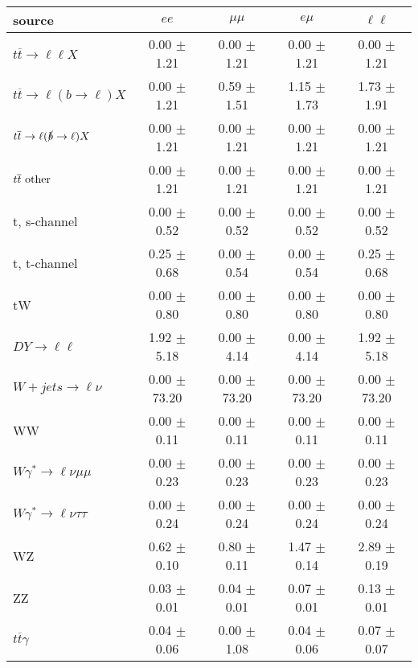 \begin{tabular}{l|cccc} \hline\hline
source & $ee$ & $\mu\mu$ & $e\mu$ & $\ell\ell $ \\
\hline
$t\overline{t} \rightarrow \ell \ell X$ &  0.00 $\pm$  1.21 &  0.00 $\pm$  1.21 &  0.00 $\pm$  1.21 &  0.00 $\pm$  1.21 \\
$t\overline{t} \rightarrow \ell (b \rightarrow \ell) X$ &  0.00 $\pm$  1.21 &  0.59 $\pm$  1.51 &  1.15 $\pm$  1.73 &  1.73 $\pm$  1.91 \\
$t\overline{t} \rightarrow \ell (\slashed b \rightarrow \ell) X$ &  0.00 $\pm$  1.21 &  0.00 $\pm$  1.21 &  0.00 $\pm$  1.21 &  0.00 $\pm$  1.21 \\
        $t\overline{t}\ \rm{other}$ &  0.00 $\pm$  1.21 &  0.00 $\pm$  1.21 &  0.00 $\pm$  1.21 &  0.00 $\pm$  1.21 \\
\hline
                       t, s-channel &  0.00 $\pm$  0.52 &  0.00 $\pm$  0.52 &  0.00 $\pm$  0.52 &  0.00 $\pm$  0.52 \\
                       t, t-channel &  0.25 $\pm$  0.68 &  0.00 $\pm$  0.54 &  0.00 $\pm$  0.54 &  0.25 $\pm$  0.68 \\
                                 tW &  0.00 $\pm$  0.80 &  0.00 $\pm$  0.80 &  0.00 $\pm$  0.80 &  0.00 $\pm$  0.80 \\
\hline
         $DY \rightarrow \ell \ell$ &  1.92 $\pm$  5.18 &  0.00 $\pm$  4.14 &  0.00 $\pm$  4.14 &  1.92 $\pm$  5.18 \\
      $W+jets \rightarrow \ell \nu$ &  0.00 $\pm$ 73.20 &  0.00 $\pm$ 73.20 &  0.00 $\pm$ 73.20 &  0.00 $\pm$ 73.20 \\
                                 WW &  0.00 $\pm$  0.11 &  0.00 $\pm$  0.11 &  0.00 $\pm$  0.11 &  0.00 $\pm$  0.11 \\
\hline
$W\gamma^{*} \rightarrow \ell \nu \mu\mu$ &  0.00 $\pm$  0.23 &  0.00 $\pm$  0.23 &  0.00 $\pm$  0.23 &  0.00 $\pm$  0.23 \\
$W\gamma^{*} \rightarrow \ell \nu \tau\tau$ &  0.00 $\pm$  0.24 &  0.00 $\pm$  0.24 &  0.00 $\pm$  0.24 &  0.00 $\pm$  0.24 \\
                                 WZ &  0.62 $\pm$  0.10 &  0.80 $\pm$  0.11 &  1.47 $\pm$  0.14 &  2.89 $\pm$  0.19 \\
                                 ZZ &  0.03 $\pm$  0.01 &  0.04 $\pm$  0.01 &  0.07 $\pm$  0.01 &  0.13 $\pm$  0.01 \\
\hline
              $t\overline{t}\gamma$ &  0.04 $\pm$  0.06 &  0.00 $\pm$  1.08 &  0.04 $\pm$  0.06 &  0.07 $\pm$  0.07 \\

\end{tabular}
